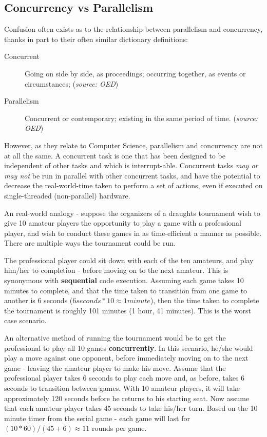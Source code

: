 \subsection{Concurrency vs Parallelism}
\label{sub:concurrencyparallelism}


Confusion often exists as to the relationship between parallelism and concurrency, thanks in part to their often similar dictionary definitions:

\begin{description}
  \item[Concurrent] Going on side by side, as proceedings; occurring together, as events or circumstances; (\textit{source: OED})
  \item[Parallelism] Concurrent or contemporary; existing in the same period of time. (\textit{source: OED})
\end{description}

However, as they relate to Computer Science, parallelism and concurrency are not at all the same. A concurrent task is one that has been designed to be independent of other tasks and which is interrupt-able. Concurrent tasks \emph{may or may not} be run in parallel with other concurrent tasks, and have the potential to decrease the real-world-time taken to perform a set of actions, even if executed on single-threaded (non-parallel) hardware.

An real-world analogy - suppose the organizers of a draughts tournament wish to give 10 amateur players the opportunity to play a game with a professional player, and wish to conduct these games in as time-efficient a manner as possible. There are multiple ways the tournament could be run.

The professional player could sit down with each of the ten amateurs, and play him/her to completion - before moving on to the next amateur. This is synonymous with \textbf{sequential} code execution. Assuming each game takes 10 minutes to complete, and that the time taken to transition from one game to another is 6 seconds ($6seconds * 10 \approx 1 minute$), then the time taken to complete the tournament is roughly 101 minutes (1 hour, 41 minutes). This is the worst case scenario.

An alternative method of running the tournament would be to get the professional to play all 10 games \textbf{concurrently}. In this scenario, he/she would play a move against one opponent, before immediately moving on to the next game - leaving the amateur player to make his move. Assume that the professional player takes 6 seconds to play each move and, as before, takes 6 seconds to transition between games. With 10 amateur players, it will take approximately 120 seconds before he returns to his starting seat. Now assume that each amateur player takes 45 seconds to take his/her turn. Based on the 10 minute timer from the serial game - each game will last for $(10 * 60) / (45 + 6)\approx 11$ rounds per game.


